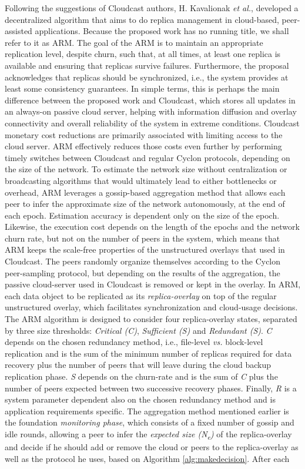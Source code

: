 \documentclass[runningheads]{llncs}
\begin{document}
Following the suggestions of Cloudcast authors, H. Kavalionak \textit{et al.}, developed a decentralized algorithm \cite{marriage_of_convinience} that aims to do replica management in cloud-based, peer-assisted applications. Because the proposed work has no running title, we shall refer to it as ARM. The goal of the ARM is to maintain an appropriate replication level, despite churn, such that, at all times, at least one replica is available and ensuring that replicas survive failures. Furthermore, the proposal acknowledges that replicas should be synchronized, i.e., the system provides at least some consistency guarantees. In simple terms, this is perhaps the main difference between the proposed work and Cloudcast, which stores all updates in an always-on passive cloud server, helping with information diffusion and overlay connectivity and overall reliability of the system in extreme conditions. Cloudcast monetary cost reductions are primarily associated with limiting access to the cloud server. ARM effectively reduces those costs even further by performing timely switches between Cloudcast and regular Cyclon protocols, depending on the size of the network. To estimate the network size without centralization or broadcasting algorithms that would ultimately lead to either bottlenecks or overhead, ARM leverages a gossip-based aggregation method \cite{gossip-based_aggregation} that allows each peer to infer the approximate size of the network autonomously, at the end of each epoch. Estimation accuracy is dependent only on the size of the epoch. Likewise, the execution cost depends on the length of the epochs and the network churn rate, but not on the number of peers in the system, which means that ARM keeps the scale-free properties of the unstructured overlays that used in Cloudcast. The peers randomly organize themselves according to the Cyclon peer-sampling protocol, but depending on the results of the aggregation, the passive cloud-server used in Cloudcast is removed or kept in the overlay. In ARM, each data object to be replicated as its \textit{replica-overlay} on top of the regular unstructured overlay, which facilitates synchronization and cloud-usage decisions. The ARM algorithm is designed to consider four replica-overlay states, separated by three size thresholds: \textit{Critical (C)}, \textit{Sufficient (S)} and \textit{Redundant (S)}. \textit{C} depends on the chosen redundancy method, i.e., file-level \textit{vs.} block-level replication and is the sum of the minimum number of replicas required for data recovery plus the number of peers that will leave during the cloud backup replication phase. \textit{S} depends on the churn-rate and is the sum of \textit{C} plus the number of peers expected between two successive recovery phases. Finally, \textit{R} is a system parameter dependent also on the chosen redundancy method and is application requirements specific.  The aggregation method mentioned earlier is the foundation \textit{monitoring phase}, which consists of a fixed number of gossip and idle rounds, allowing a peer to infer the \textit{expected size (N\textsubscript{e})} of the replica-overlay and decide if he should add or remove the cloud or peers to the replica-overlay as well as the protocol he uses, based on Algorithm \ref{alg:makedecision}. After each 
\end{document}

